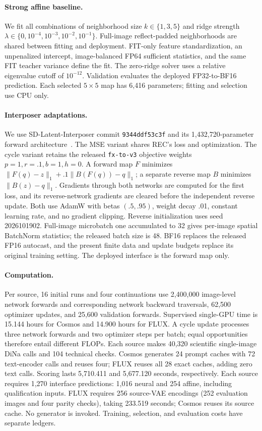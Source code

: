 \documentclass[10pt,twocolumn,letterpaper]{article}
\begin{document}
\paragraph{Strong affine baseline.}
We fit all combinations of neighborhood size $k\in\{1,3,5\}$ and ridge strength $\lambda\in\{0,10^{-4},10^{-3},10^{-2},10^{-1}\}$. Full-image reflect-padded neighborhoods are shared between fitting and deployment. FIT-only feature standardization, an unpenalized intercept, image-balanced FP64 sufficient statistics, and the same FIT teacher variance define the fit. The zero-ridge solver uses a relative eigenvalue cutoff of $10^{-12}$. Validation evaluates the deployed FP32-to-BF16 prediction. Each selected $5\times5$ map has 6,416 parameters; fitting and selection use CPU only.

\paragraph{Interposer adaptations.}
We use SD-Latent-Interposer commit \texttt{9344ddf53c3f} and its 1,432,720-parameter forward architecture~\cite{city96latentinterposer}. The MSE variant shares REC's loss and optimization. The cycle variant retains the released \texttt{fx-to-v3} objective weights $p=1,r=.1,b=1,h=0$. A forward map $F$ minimizes $\|F(q)-z\|_1+.1\|B(F(q))-q\|_1$; a separate reverse map $B$ minimizes $\|B(z)-q\|_1$. Gradients through both networks are computed for the first loss, and its reverse-network gradients are cleared before the independent reverse update. Both use AdamW with betas $(.5,.95)$, weight decay .01, constant learning rate, and no gradient clipping. Reverse initialization uses seed 2026101902. Full-image microbatch one accumulated to 32 gives per-image spatial BatchNorm statistics; the released batch size is 48. BF16 replaces the released FP16 autocast, and the present finite data and update budgets replace its original training setting. The deployed interface is the forward map only.

\paragraph{Computation.}
Per source, 16 initial runs and four continuations use 2,400,000 image-level network forwards and corresponding network backward traversals, 62,500 optimizer updates, and 25,600 validation forwards. Supervised single-GPU time is 15.144 hours for Cosmos and 14.900 hours for FLUX. A cycle update processes three network forwards and two optimizer steps per batch; equal opportunities therefore entail different FLOPs. Each source makes 40,320 scientific single-image DiNa calls and 104 technical checks. Cosmos generates 24 prompt caches with 72 text-encoder calls and reuses four; FLUX reuses all 28 exact caches, adding zero text calls. Scoring lasts 5,710.411 and 5,677.120 seconds, respectively. Each source requires 1,270 interface predictions: 1,016 neural and 254 affine, including qualification inputs. FLUX requires 256 source-VAE encodings (252 evaluation images and four parity checks), taking 233.519 seconds; Cosmos reuses its source cache. No generator is invoked. Training, selection, and evaluation costs have separate ledgers.
\end{document}
